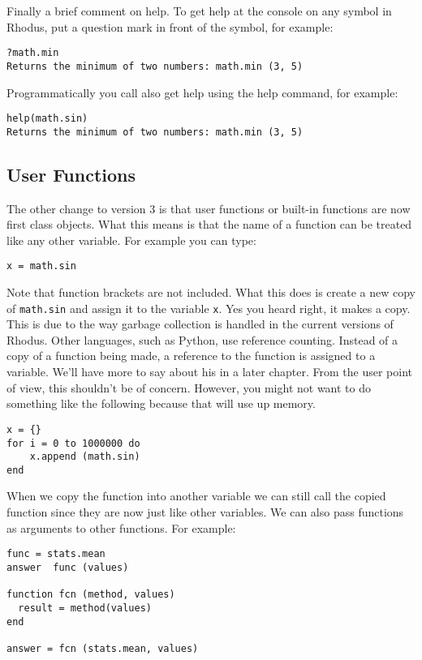 Finally a brief comment on help. To get help at the console on any symbol in Rhodus, put a question mark in front of the symbol, for example:

\begin{lstlisting}
?math.min
Returns the minimum of two numbers: math.min (3, 5)
\end{lstlisting}

Programmatically you call also get help using the help command, for example:

\begin{lstlisting}
help(math.sin)
Returns the minimum of two numbers: math.min (3, 5)
\end{lstlisting}


\subsection{User Functions}

The other change to version 3 is that user functions or built-in functions are now first class objects. What this means is that the name of a function can be treated like any other variable. For example you can type:


\begin{lstlisting}
x = math.sin
\end{lstlisting}

Note that function brackets are not included. What this does is create a new copy of {\tt math.sin} and assign it to the variable {\tt x}. Yes you heard right, it makes a copy. This is due to the way garbage collection is handled in the current versions of Rhodus. Other languages, such as Python, use reference counting. Instead of a copy of a function being made, a reference to the function is assigned to a variable. We'll have more to say about his in a later chapter. From the user point of view, this shouldn't be of concern. However, you might not want to do something like the following because that will use up memory.

\begin{lstlisting}
x = {}
for i = 0 to 1000000 do
    x.append (math.sin)
end
\end{lstlisting}

When we copy the function into another variable we can still call the copied function since they are now just like other variables. We can also pass functions as arguments to other functions. For example:

\begin{lstlisting}
func = stats.mean
answer  func (values)

function fcn (method, values)
  result = method(values)
end

answer = fcn (stats.mean, values)
\end{lstlisting}

